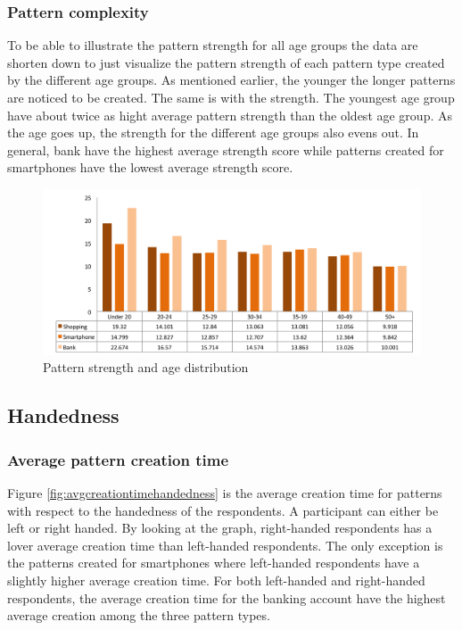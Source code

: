     \subsubsection{Pattern complexity}
    To be able to illustrate the pattern strength for all age groups the data are shorten down to just visualize the pattern strength of each pattern type created by the different age groups. As mentioned earlier, the younger the longer patterns are noticed to be created. The same is with the strength. The youngest age group have about twice as hight average pattern strength than the oldest age group. As the age goes up, the strength for the different age groups also evens out. In general, bank have the highest average strength score while patterns created for smartphones have the lowest average strength score.

    \begin{figure}[H]
      \centering
      \includegraphics[width=\textwidth]{pics/analysis/strengthagedist.png}
      \caption{Pattern strength and age distribution}
      \label{fig:strengthagedist}
    \end{figure}

	\subsection{Handedness}\label{sec:subgroupHandedness}

    \subsubsection{Average pattern creation time}
      Figure \ref{fig:avgcreationtimehandedness} is the average creation time for patterns with respect to the handedness of the respondents. A participant can either be left or right handed. By looking at the graph, right-handed respondents has a lover average creation time than left-handed respondents. The only exception is the patterns created for smartphones where left-handed respondents have a slightly higher average creation time. 
      For both left-handed and right-handed respondents, the average creation time for the banking account have the highest average creation among the three pattern types. 

